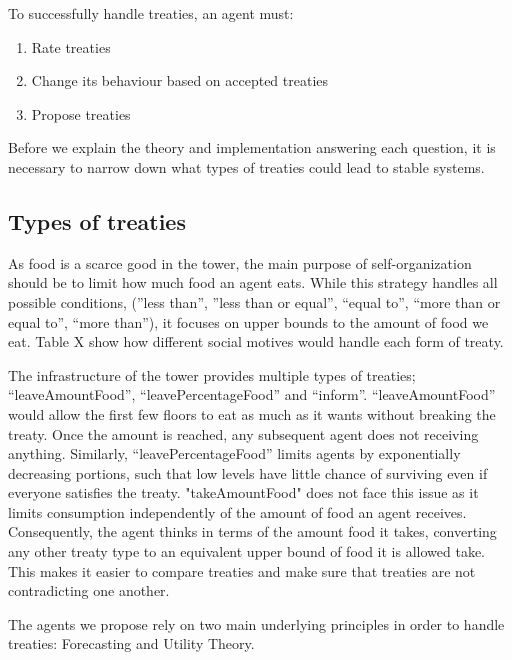 To successfully handle treaties, an agent must:

\begin{enumerate}
    \item Rate treaties
    \item Change its behaviour based on accepted treaties
    \item Propose treaties
\end{enumerate}

Before we explain the theory and implementation answering each question, it is necessary to narrow down what types of treaties could lead to stable systems. 

\subsection{Types of treaties}

As food is a scarce good in the tower, the main purpose of self-organization should be to limit how much food an agent eats. While this strategy handles all possible conditions, (”less than”, ”less than or equal”, “equal to”, “more than or equal to”, “more than”), it focuses on upper bounds to the amount of food we eat. Table X show how different social motives would handle each form of treaty.


The infrastructure of the tower provides multiple types of treaties; “leaveAmountFood”, “leavePercentageFood” and “inform”.  “leaveAmountFood” would allow the first few floors to eat as much as it wants without breaking the treaty. Once the amount is reached, any subsequent agent does not receiving anything. Similarly, “leavePercentageFood” limits agents by exponentially decreasing portions, such that low levels have little chance of surviving even if everyone satisfies the treaty. "takeAmountFood" does not face this issue as it limits consumption independently of the amount of food an agent receives. Consequently, the agent thinks in terms of the amount food it takes, converting any other treaty type to an equivalent upper bound of food it is allowed take. This makes it easier to compare treaties and make sure that treaties are not contradicting one another.

The agents we propose rely on two main underlying principles in order to handle treaties: Forecasting and Utility Theory.

